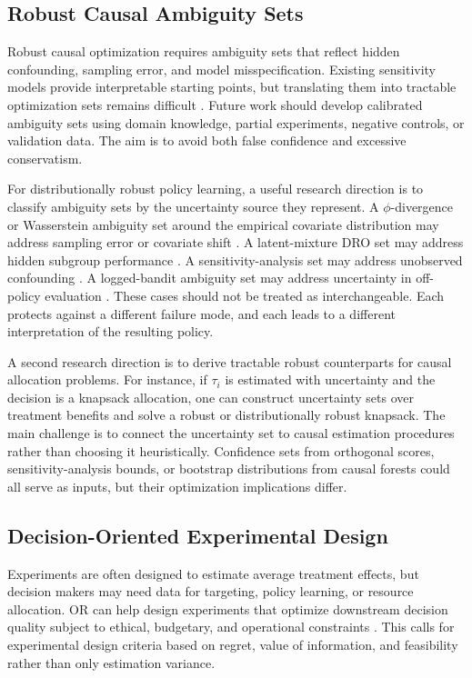 \documentclass[11pt]{article}
\begin{document}
\subsection{Robust Causal Ambiguity Sets}

Robust causal optimization requires ambiguity sets that reflect hidden confounding, sampling error, and model misspecification. Existing sensitivity models provide interpretable starting points, but translating them into tractable optimization sets remains difficult \citep{rosenbaum2002observational,kallus2018confounding}. Future work should develop calibrated ambiguity sets using domain knowledge, partial experiments, negative controls, or validation data. The aim is to avoid both false confidence and excessive conservatism.

For distributionally robust policy learning, a useful research direction is to classify ambiguity sets by the uncertainty source they represent. A $\phi$-divergence or Wasserstein ambiguity set around the empirical covariate distribution may address sampling error or covariate shift \citep{rahimian2019dro,kuhn2019wasserstein}. A latent-mixture DRO set may address hidden subgroup performance \citep{duchi2023latent}. A sensitivity-analysis set may address unobserved confounding \citep{rosenbaum2002observational,kallus2018confounding}. A logged-bandit ambiguity set may address uncertainty in off-policy evaluation \citep{si2020dro}. These cases should not be treated as interchangeable. Each protects against a different failure mode, and each leads to a different interpretation of the resulting policy.

A second research direction is to derive tractable robust counterparts for causal allocation problems. For instance, if $\tau_i$ is estimated with uncertainty and the decision is a knapsack allocation, one can construct uncertainty sets over treatment benefits and solve a robust or distributionally robust knapsack. The main challenge is to connect the uncertainty set to causal estimation procedures rather than choosing it heuristically. Confidence sets from orthogonal scores, sensitivity-analysis bounds, or bootstrap distributions from causal forests could all serve as inputs, but their optimization implications differ.

\subsection{Decision-Oriented Experimental Design}

Experiments are often designed to estimate average treatment effects, but decision makers may need data for targeting, policy learning, or resource allocation. OR can help design experiments that optimize downstream decision quality subject to ethical, budgetary, and operational constraints \citep{kallus2018balance}. This calls for experimental design criteria based on regret, value of information, and feasibility rather than only estimation variance.
\end{document}
